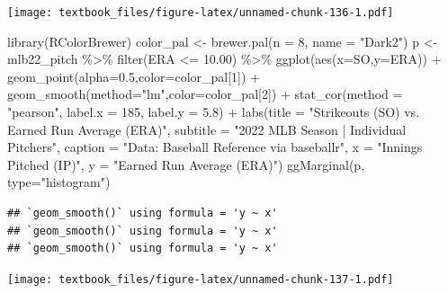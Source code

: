 \documentclass[
  11pt,
]{book}
\newenvironment{Shaded}{\begin{snugshade}}{\end{snugshade}}
\newcommand{\AttributeTok}[1]{\textcolor[rgb]{0.77,0.63,0.00}{#1}}
\newcommand{\DecValTok}[1]{\textcolor[rgb]{0.00,0.00,0.81}{#1}}
\newcommand{\FloatTok}[1]{\textcolor[rgb]{0.00,0.00,0.81}{#1}}
\newcommand{\FunctionTok}[1]{\textcolor[rgb]{0.00,0.00,0.00}{#1}}
\newcommand{\NormalTok}[1]{#1}
\newcommand{\OtherTok}[1]{\textcolor[rgb]{0.56,0.35,0.01}{#1}}
\newcommand{\SpecialCharTok}[1]{\textcolor[rgb]{0.00,0.00,0.00}{#1}}
\newcommand{\StringTok}[1]{\textcolor[rgb]{0.31,0.60,0.02}{#1}}
\theoremstyle{definition}
\theoremstyle{definition}
\theoremstyle{definition}
\theoremstyle{definition}
\theoremstyle{remark}
\begin{document}
\texttt{[image: textbook\_files/figure-latex/unnamed-chunk-136-1.pdf]}

\newpage

\begin{Shaded}
\begin{Highlighting}[]
\FunctionTok{library}\NormalTok{(RColorBrewer)}
\NormalTok{color\_pal }\OtherTok{\textless{}{-}} \FunctionTok{brewer.pal}\NormalTok{(}\AttributeTok{n =} \DecValTok{8}\NormalTok{, }\AttributeTok{name =} \StringTok{"Dark2"}\NormalTok{)}
\NormalTok{p }\OtherTok{\textless{}{-}}\NormalTok{ mlb22\_pitch }\SpecialCharTok{\%\textgreater{}\%} \FunctionTok{filter}\NormalTok{(ERA }\SpecialCharTok{\textless{}=} \FloatTok{10.00}\NormalTok{) }\SpecialCharTok{\%\textgreater{}\%}
  \FunctionTok{ggplot}\NormalTok{(}\FunctionTok{aes}\NormalTok{(}\AttributeTok{x=}\NormalTok{SO,}\AttributeTok{y=}\NormalTok{ERA)) }\SpecialCharTok{+}
  \FunctionTok{geom\_point}\NormalTok{(}\AttributeTok{alpha=}\FloatTok{0.5}\NormalTok{,}\AttributeTok{color=}\NormalTok{color\_pal[}\DecValTok{1}\NormalTok{]) }\SpecialCharTok{+}
  \FunctionTok{geom\_smooth}\NormalTok{(}\AttributeTok{method=}\StringTok{"lm"}\NormalTok{,}\AttributeTok{color=}\NormalTok{color\_pal[}\DecValTok{2}\NormalTok{]) }\SpecialCharTok{+}
  \FunctionTok{stat\_cor}\NormalTok{(}\AttributeTok{method =} \StringTok{"pearson"}\NormalTok{, }\AttributeTok{label.x =} \DecValTok{185}\NormalTok{, }\AttributeTok{label.y =} \FloatTok{5.8}\NormalTok{) }\SpecialCharTok{+}
  \FunctionTok{labs}\NormalTok{(}\AttributeTok{title =} \StringTok{"Strikeouts (SO) vs. Earned Run Average (ERA)"}\NormalTok{,}
       \AttributeTok{subtitle =} \StringTok{"2022 MLB Season | Individual Pitchers"}\NormalTok{,}
       \AttributeTok{caption =} \StringTok{"Data: Baseball Reference via baseballr"}\NormalTok{, }
       \AttributeTok{x =} \StringTok{"Innings Pitched (IP)"}\NormalTok{,}
       \AttributeTok{y =} \StringTok{"Earned Run Average (ERA)"}\NormalTok{)}
\FunctionTok{ggMarginal}\NormalTok{(p, }\AttributeTok{type=}\StringTok{"histogram"}\NormalTok{)}
\end{Highlighting}
\end{Shaded}

\begin{verbatim}
## `geom_smooth()` using formula = 'y ~ x'
## `geom_smooth()` using formula = 'y ~ x'
## `geom_smooth()` using formula = 'y ~ x'
\end{verbatim}

\texttt{[image: textbook\_files/figure-latex/unnamed-chunk-137-1.pdf]}
\end{document}
